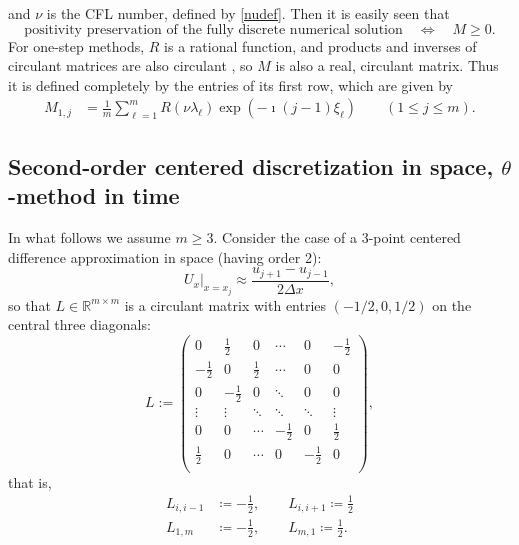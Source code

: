 \documentclass[smallextended,numbook,runningheads]{svjour3}     %
\newcommand{\dx}{\Delta x}
\begin{document}
and $\nu$ is the CFL number, defined by \eqref{nudef}.
Then it is easily seen that 
\[
\boxed{\text{positivity preservation of the fully discrete numerical solution}\quad \Longleftrightarrow \quad M\ge 0.}
\]
For one-step methods, $R$ is a rational function, and products and inverses of circulant matrices are also circulant \cite[Fact 5.16.7]{matmat}, so
$M$ is also a real, circulant matrix.
Thus it is defined completely by the entries of its first row, which
are given by
\begin{align} \label{M-entries}
    M_{1,j} & = \frac{1}{m} \sum_{\ell=1}^m R(\nu\lambda_\ell) \exp(-\imath(j-1)\xi_\ell) \quad\quad (1\le j\le m).
\end{align}

\subsection{Second-order centered discretization in space, \texorpdfstring{$\theta$}{}-method in time}\label{sectioncentered}
In what follows we assume $m \ge 3$. Consider the case of a 3-point centered difference approximation in space (having order 2):
\[
    U_x\Big|_{x=x_j} \approx \frac{u_{j+1}-u_{j-1}}{2\dx},
\]
so that $L\in\mathbb{R}^{m\times m}$ is a circulant matrix with entries $(-1/2, 0, 1/2)$ on the central
three diagonals:
\begin{equation}\label{Ldef}
L:=\left(
\begin{array}{cccccc}
 0 & \frac{1}{2} & 0  & \cdots & 0 & -\frac{1}{2} \\
 -\frac{1}{2} & 0 & \frac{1}{2} &  \cdots & 0 & 0 \\
 0 & -\frac{1}{2} & 0 &  \ddots & 0 & 0\\
 \vdots  & \vdots  & \ddots  & \ddots & \ddots & \vdots \\
  0 & 0 & \cdots  & -\frac{1}{2} & 0 & \frac{1}{2} \\
 \frac{1}{2} & 0 & \cdots & 0 & -\frac{1}{2} & 0 \\
\end{array}
\right),
\end{equation}
that is,
\begin{subequations}
\begin{align*}
    L_{i,i-1} & \coloneqq -\frac{1}{2},\quad\quad L_{i,i+1} \coloneqq  \frac{1}{2} \\
    L_{1,m} & \coloneqq -\frac{1}{2}, \quad \quad L_{m,1} \coloneqq \frac{1}{2}.
\end{align*}
\end{subequations}
\end{document}
